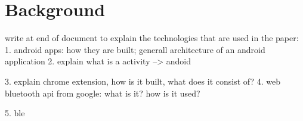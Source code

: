 \section{Background}
\label{background}
write at end of document to explain the technologies that are used in the paper:
1. android apps: how they are built; generall architecture of an android application
2. explain what is a activity --> andoid

3. explain chrome extension, how is it built, what does it consist of?
4. web bluetooth api from google: what is it? how is it used?

5. ble
